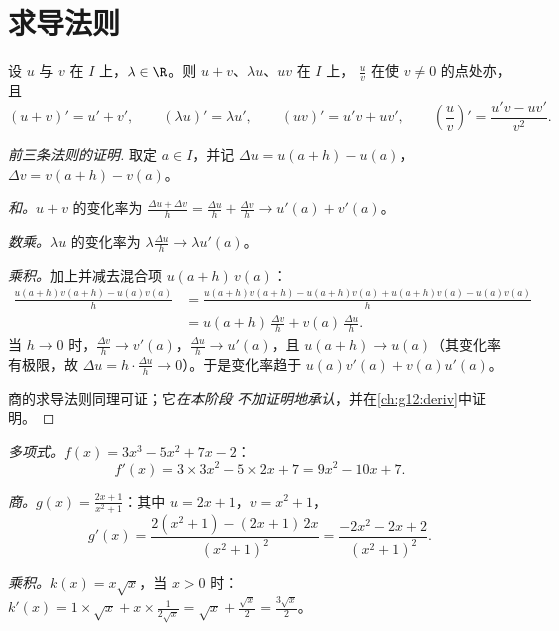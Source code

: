 \section{求导法则}

\begin{theorem}[运算法则]\label{thm:g11:deriv:rules}
设 $u$ 与 $v$ 在 $I$ 上，$\lambda \in \R$。则
$u + v$、$\lambda u$、$uv$ 在 $I$ 上，
$\frac{u}{v}$ 在使 $v \neq 0$ 的点处亦，且
\[
(u+v)' = u' + v', \qquad
(\lambda u)' = \lambda u', \qquad
(uv)' = u'v + uv', \qquad
\left(\frac{u}{v}\right)' = \frac{u'v - uv'}{v^2}.
\]
\end{theorem}

\begin{proof}[前三条法则的证明]
取定 $a \in I$，并记 $\Delta u = u(a+h) - u(a)$，
$\Delta v = v(a+h) - v(a)$。

\emph{和。}$u + v$ 的变化率为
$\frac{\Delta u + \Delta v}{h} = \frac{\Delta u}{h} + \frac{\Delta v}{h}
\to u'(a) + v'(a)$。

\emph{数乘。}$\lambda u$ 的变化率为
$\lambda \frac{\Delta u}{h} \to \lambda u'(a)$。

\emph{乘积。}加上并减去混合项 $u(a+h)\,v(a)$：
\begin{align*}
\frac{u(a+h)v(a+h) - u(a)v(a)}{h}
&= \frac{u(a+h)v(a+h) - u(a+h)v(a) + u(a+h)v(a) - u(a)v(a)}{h}\\
&= u(a+h)\,\frac{\Delta v}{h} + v(a)\,\frac{\Delta u}{h}.
\end{align*}
当 $h \to 0$ 时，$\frac{\Delta v}{h} \to v'(a)$，$\frac{\Delta u}{h} \to
u'(a)$，且 $u(a+h) \to u(a)$（其变化率有极限，故
$\Delta u = h \cdot \frac{\Delta u}{h} \to 0$）。于是变化率趋于
$u(a)v'(a) + v(a)u'(a)$。

商的求导法则同理可证；它\emph{在本阶段
不加证明地承认}，并在\cref{ch:g12:deriv}中证明。
\end{proof}

\begin{example}\label{ex:g11:deriv:computations}
\emph{多项式。}$f(x) = 3x^3 - 5x^2 + 7x - 2$：
\[
f'(x) = 3 \times 3x^2 - 5 \times 2x + 7 = 9x^2 - 10x + 7 .
\]

\emph{商。}$g(x) = \frac{2x+1}{x^2+1}$：其中 $u = 2x + 1$，$v = x^2
+ 1$，
\[
g'(x) = \frac{2(x^2+1) - (2x+1)\,2x}{(x^2+1)^2}
= \frac{-2x^2 - 2x + 2}{(x^2+1)^2}.
\]

\emph{乘积。}$k(x) = x\sqrt x$，当 $x > 0$ 时：
$k'(x) = 1 \times \sqrt x + x \times \frac{1}{2\sqrt x}
= \sqrt x + \frac{\sqrt x}{2} = \frac{3\sqrt x}{2}$。
\end{example}

